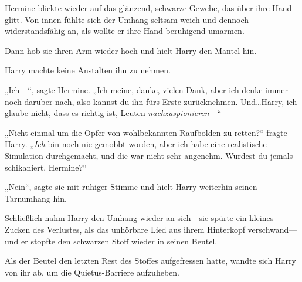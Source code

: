Hermine blickte wieder auf das glänzend, schwarze Gewebe, das über ihre Hand glitt. Von innen fühlte sich der Umhang seltsam weich und dennoch widerstandsfähig an, als wollte er ihre Hand beruhigend umarmen.

Dann hob sie ihren Arm wieder hoch und hielt Harry den Mantel hin.

Harry machte keine Anstalten ihn zu nehmen.

„Ich—“, sagte Hermine. „Ich meine, danke, vielen Dank, aber ich denke immer noch darüber nach, also kannst du ihn fürs Erste zurücknehmen. Und…Harry, ich glaube nicht, dass es richtig ist, Leuten \emph{nachzuspionieren}—“

„Nicht einmal um die Opfer von wohlbekannten Raufbolden zu retten?“ fragte Harry. „\emph{Ich} bin noch nie gemobbt worden, aber ich habe eine realistische Simulation durchgemacht, und die war nicht sehr angenehm. Wurdest du jemals schikaniert, Hermine?“

„Nein“, sagte sie mit ruhiger Stimme und hielt Harry weiterhin seinen Tarnumhang hin.

Schließlich nahm Harry den Umhang wieder an sich—sie spürte ein kleines Zucken des Verlustes, als das unhörbare Lied aus ihrem Hinterkopf verschwand—und er stopfte den schwarzen Stoff wieder in seinen Beutel.

Als der Beutel den letzten Rest des Stoffes aufgefressen hatte, wandte sich Harry von ihr ab, um die Quietus-Barriere aufzuheben.


